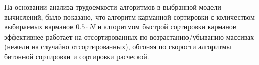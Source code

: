 \documentclass[12pt]{report}
\begin{document}
	На основании анализа трудоемкости алгоритмов в выбранной модели вычислений, было показано, что алгоритм карманной сортировки с количеством выбираемых карманов $0.5 \cdot N$ и алгоритмом быстрой сортировки карманов эффективнее работает на отсортированных по возрастанию/убыванию массивах (нежели на случайно отсортированных), обгоняя по скорости алгоритмы битонной сортировки и сортировки расческой.
	

\nocite{*} 

\renewcommand\bibname{Список литературы} %
	
\end{document}
